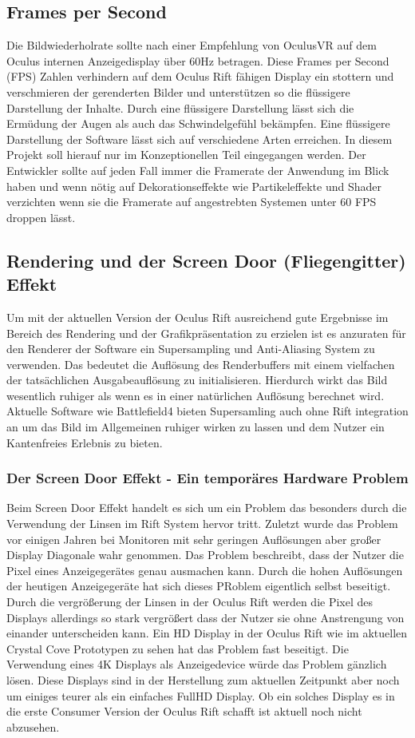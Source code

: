 \documentclass[pagesize, paper=a4, fontsize=12pt,titlepage=true, headings=small, headnosepline, abstractoff, liststotoc, nochapterprefix, plainheadsepline]{scrreprt}
\begin{document}
\subsection{Frames per Second}
Die Bildwiederholrate sollte nach einer Empfehlung von OculusVR auf dem Oculus internen Anzeigedisplay über 60Hz betragen. Diese Frames per Second (FPS) Zahlen verhindern auf dem Oculus Rift fähigen Display ein stottern und verschmieren der gerenderten Bilder und unterstützen so die flüssigere Darstellung der Inhalte. Durch eine flüssigere Darstellung lässt sich die Ermüdung der Augen als auch das Schwindelgefühl bekämpfen. Eine flüssigere Darstellung der Software lässt sich auf verschiedene Arten erreichen. In diesem Projekt soll hierauf nur im Konzeptionellen Teil eingegangen werden. Der Entwickler sollte auf jeden Fall immer die Framerate der Anwendung im Blick haben und wenn nötig auf Dekorationseffekte wie Partikeleffekte und Shader verzichten wenn sie die Framerate auf angestrebten Systemen unter 60 FPS droppen lässt.

\subsection{Rendering und der Screen Door (Fliegengitter) Effekt}
Um mit der aktuellen Version der Oculus Rift ausreichend gute Ergebnisse im Bereich des Rendering und der Grafikpräsentation zu erzielen ist es anzuraten für den Renderer der Software ein Supersampling und Anti-Aliasing System zu verwenden. Das bedeutet die Auflösung des Renderbuffers mit einem vielfachen der tatsächlichen Ausgabeauflösung zu initialisieren. Hierdurch wirkt das Bild wesentlich ruhiger als wenn es in einer natürlichen Auflösung berechnet wird. Aktuelle Software wie Battlefield4 bieten Supersamling auch ohne Rift integration an um das Bild im Allgemeinen ruhiger wirken zu lassen und dem Nutzer ein Kantenfreies Erlebnis zu bieten. 

\subsubsection{Der Screen Door Effekt - Ein temporäres Hardware Problem}
Beim Screen Door Effekt handelt es sich um ein Problem das besonders durch die Verwendung der Linsen im Rift System hervor tritt. Zuletzt wurde das Problem vor einigen Jahren bei Monitoren mit sehr geringen Auflösungen aber großer Display Diagonale wahr genommen. Das Problem beschreibt, dass der Nutzer die Pixel eines Anzeigegerätes genau ausmachen kann. Durch die hohen Auflösungen der heutigen Anzeigegeräte hat sich dieses PRoblem eigentlich selbst beseitigt. Durch die vergrößerung der Linsen in der Oculus Rift werden die Pixel des Displays allerdings so stark vergrößert dass der Nutzer sie ohne Anstrengung von einander unterscheiden kann. Ein HD Display in der Oculus Rift wie im aktuellen Crystal Cove Prototypen zu sehen hat das Problem fast beseitigt. Die Verwendung eines 4K Displays als Anzeigedevice würde das Problem gänzlich lösen. Diese Displays sind in der Herstellung zum aktuellen Zeitpunkt aber noch um einiges teurer als ein einfaches FullHD Display. Ob ein solches Display es in die erste Consumer Version der Oculus Rift schafft ist aktuell noch nicht abzusehen.
\end{document}
